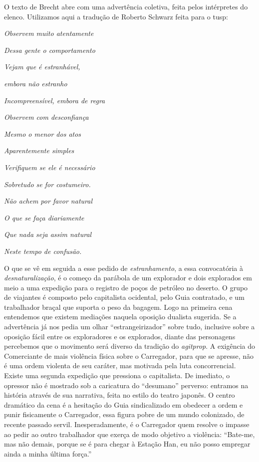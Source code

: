 O texto de Brecht abre com uma advertência coletiva, feita pelos
intérpretes do elenco. Utilizamos aqui a tradução de Roberto Schwarz
feita para o {\sc tusp}:

\startblockquote
{\it Observem muito atentamente}

{\it Dessa gente o comportamento}

{\it Vejam que é estranhável,}

{\it embora não estranho}

{\it Incompreensível, embora de regra}

{\it Observem com desconfiança}

{\it Mesmo o menor dos atos}

{\it Aparentemente simples}

{\it Verifiquem se ele é necessário}

{\it Sobretudo se for costumeiro.}

{\it Não achem por favor natural}

{\it O que se faça diariamente}

{\it Que nada seja assim natural}

{\it Neste tempo de confusão.}
\stopblockquote

O que se vê em seguida a esse pedido de {\it estranhamento}, a essa
convocatória à {\it desnaturalização}, é o começo da parábola de um
explorador e dois explorados em meio a uma expedição para o registro de
poços de petróleo no deserto. O grupo de viajantes é composto pelo
capitalista ocidental, pelo Guia contratado, e um trabalhador braçal que
suporta o peso da bagagem. Logo na primeira cena entendemos que existem
mediações naquela oposição dualista sugerida. Se a advertência já nos
pedia um olhar “estrangeirizador” sobre tudo, inclusive sobre a oposição
fácil entre os exploradores e os explorados, diante das personagens
percebemos que o movimento será diverso da tradição do {\it agitprop}. A
exigência do Comerciante de mais violência física sobre o Carregador,
para que se apresse, não é uma ordem violenta de seu caráter, mas
motivada pela luta concorrencial. Existe uma segunda expedição que
pressiona o capitalista. De imediato, o opressor não é mostrado sob a
caricatura do “desumano” perverso: entramos na história através de sua
narrativa, feita no estilo do teatro japonês. O centro dramático da cena
é a hesitação do Guia sindicalizado em obedecer a ordem e punir
fisicamente o Carregador, essa figura pobre de um mundo colonizado, de
recente passado servil. Inesperadamente, é o Carregador quem resolve o
impasse ao pedir ao outro trabalhador que exerça de modo objetivo a
violência: “Bate-me, mas não demais, porque se é para chegar à Estação
Han, eu não posso empregar ainda a minha última força.”


